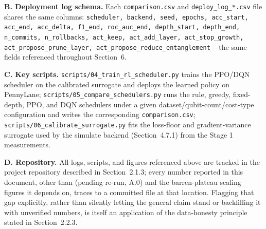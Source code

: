 \textbf{B. Deployment log schema.} Each \texttt{comparison.csv} and \texttt{deploy\_log\_*.csv} file shares the same columns: \texttt{scheduler, backend, seed, epochs, acc\_start, acc\_end, acc\_delta, f1\_end, roc\_auc\_end, depth\_start, depth\_end, n\_commits, n\_rollbacks, act\_keep, act\_add\_layer, act\_stop\_growth, act\_propose\_prune\_layer, act\_propose\_reduce\_entanglement} -- the same fields referenced throughout Section~6.

\textbf{C. Key scripts.} \texttt{scripts/04\_train\_rl\_scheduler.py} trains the PPO/DQN scheduler on the calibrated surrogate and deploys the learned policy on PennyLane; \texttt{scripts/05\_compare\_schedulers.py} runs the rule, greedy, fixed-depth, PPO, and DQN schedulers under a given dataset/qubit-count/cost-type configuration and writes the corresponding \texttt{comparison.csv}; \texttt{scripts/06\_calibrate\_surrogate.py} fits the loss-floor and gradient-variance surrogate used by the simulate backend (Section~4.7.1) from the Stage 1 measurements.

\textbf{D. Repository.} All logs, scripts, and figures referenced above are tracked in the project repository described in Section~2.1.3; every number reported in this document, other than  (pending re-run, A.0) and the barren-plateau scaling figures it depends on, traces to a committed file at that location. Flagging that gap explicitly, rather than silently letting the general claim stand or backfilling it with unverified numbers, is itself an application of the data-honesty principle stated in Section~2.2.3.

